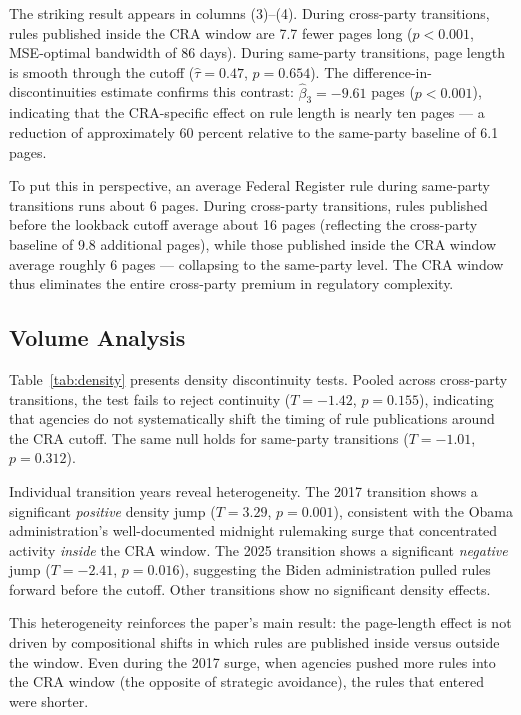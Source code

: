 \documentclass[12pt]{article}
\begin{document}
The striking result appears in columns (3)--(4). During cross-party transitions, rules published inside the CRA window are 7.7 fewer pages long ($p < 0.001$, MSE-optimal bandwidth of 86 days). During same-party transitions, page length is smooth through the cutoff ($\hat{\tau} = 0.47$, $p = 0.654$). The difference-in-discontinuities estimate confirms this contrast: $\hat{\beta}_3 = -9.61$ pages ($p < 0.001$), indicating that the CRA-specific effect on rule length is nearly ten pages --- a reduction of approximately 60 percent relative to the same-party baseline of 6.1 pages.

To put this in perspective, an average Federal Register rule during same-party transitions runs about 6 pages. During cross-party transitions, rules published before the lookback cutoff average about 16 pages (reflecting the cross-party baseline of 9.8 additional pages), while those published inside the CRA window average roughly 6 pages --- collapsing to the same-party level. The CRA window thus eliminates the entire cross-party premium in regulatory complexity.

\subsection{Volume Analysis}



Table~\ref{tab:density} presents density discontinuity tests. Pooled across cross-party transitions, the test fails to reject continuity ($T = -1.42$, $p = 0.155$), indicating that agencies do not systematically shift the timing of rule publications around the CRA cutoff. The same null holds for same-party transitions ($T = -1.01$, $p = 0.312$).

Individual transition years reveal heterogeneity. The 2017 transition shows a significant \textit{positive} density jump ($T = 3.29$, $p = 0.001$), consistent with the Obama administration's well-documented midnight rulemaking surge that concentrated activity \textit{inside} the CRA window. The 2025 transition shows a significant \textit{negative} jump ($T = -2.41$, $p = 0.016$), suggesting the Biden administration pulled rules forward before the cutoff. Other transitions show no significant density effects.

This heterogeneity reinforces the paper's main result: the page-length effect is not driven by compositional shifts in which rules are published inside versus outside the window. Even during the 2017 surge, when agencies pushed more rules into the CRA window (the opposite of strategic avoidance), the rules that entered were shorter.
\end{document}
